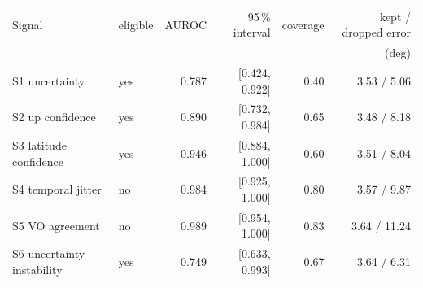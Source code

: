 \footnotesize
\begin{tabular}{llrrrr}
\toprule
Signal & eligible & AUROC & 95\,\% interval & coverage & kept / dropped error \\
 & & & & & (deg) \\
\midrule
S1 uncertainty & yes & 0.787 & [0.424, 0.922] & 0.40 & 3.53 / 5.06 \\
S2 up confidence & yes & 0.890 & [0.732, 0.984] & 0.65 & 3.48 / 8.18 \\
S3 latitude confidence & yes & 0.946 & [0.884, 1.000] & 0.60 & 3.51 / 8.04 \\
S4 temporal jitter & no & 0.984 & [0.925, 1.000] & 0.80 & 3.57 / 9.87 \\
S5 VO agreement & no & 0.989 & [0.954, 1.000] & 0.83 & 3.64 / 11.24 \\
S6 uncertainty instability & yes & 0.749 & [0.633, 0.993] & 0.67 & 3.64 / 6.31 \\
\bottomrule
\end{tabular}
